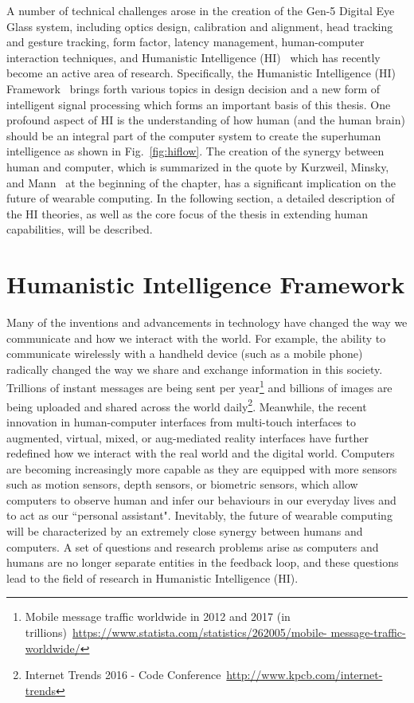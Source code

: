 A number of technical challenges arose in the creation of the Gen-5 Digital Eye Glass system, 
including optics design, calibration and alignment, head tracking and gesture tracking, form factor, 
latency management, human-computer interaction techniques, and Humanistic Intelligence 
(HI)~\cite{azuma1997survey, azuma2001recent, mann2001wearable}  which has recently become an 
active area of research. Specifically, the Humanistic Intelligence (HI) 
Framework~\cite{mann2001wearable} brings forth various topics in design decision and a new form of 
intelligent signal processing which forms an important basis of this thesis. One profound aspect of HI 
is the understanding of how human (and the human brain) should be an integral part of the computer 
system to create the superhuman intelligence as shown in Fig.~\ref{fig:hiflow}. The creation of the 
synergy between human and computer, which is summarized in the quote by Kurzweil, Minsky, and 
Mann~\cite{minsky2013society} at the beginning of the chapter, has a significant implication on the 
future of wearable computing. In the following section, a detailed description of the HI theories, as well 
as the core focus of the thesis in extending human capabilities, will be described.

\section{Humanistic Intelligence Framework}
\label{hiframeworks}

Many of the inventions and advancements in technology have changed the way we communicate and 
how we interact with the world. For example, the ability to communicate wirelessly with a handheld 
device (such as a mobile phone) radically changed the way we share and exchange information in 
this society. Trillions of instant messages are being sent per year\footnote{Mobile message traffic 
worldwide in 2012 and 2017 (in trillions)~\url{https://www.statista.com/statistics/262005/mobile-
message-traffic-worldwide/}} and billions of images are being uploaded and shared across the world 
daily\footnote{Internet Trends 2016 - Code Conference~\url{http://www.kpcb.com/internet-trends}}. 
Meanwhile, the recent innovation in human-computer interfaces from multi-touch interfaces to 
augmented, virtual, mixed, or aug-mediated reality interfaces have further redefined how we interact 
with the real world and the digital world. Computers are becoming increasingly more capable as they 
are equipped with more sensors such as motion sensors, depth sensors, or biometric sensors, which 
allow computers to observe human and infer our behaviours in our everyday lives and to act as our 
``personal assistant". Inevitably, the future of wearable computing will be characterized by an 
extremely close synergy between humans and computers. A set of questions and research problems 
arise as computers and humans are no longer separate entities in the feedback loop, and these 
questions lead to the field of research in Humanistic Intelligence (HI). 

